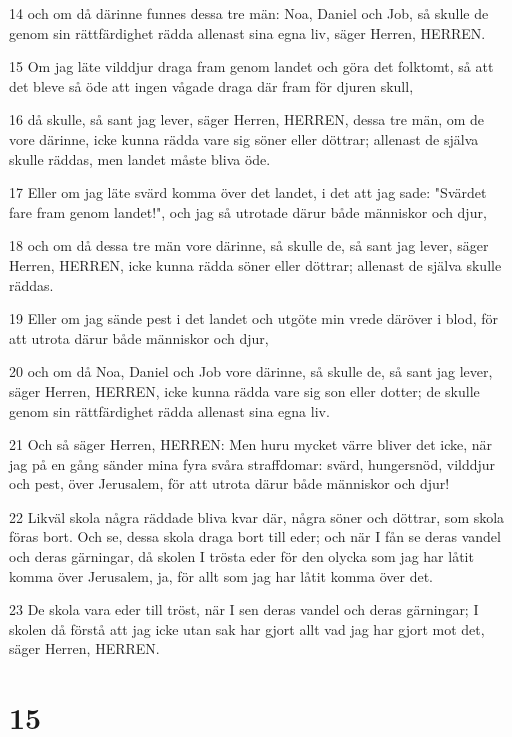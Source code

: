 \par 14 och om då därinne funnes dessa tre män: Noa, Daniel och Job, så skulle de genom sin rättfärdighet rädda allenast sina egna liv, säger Herren, HERREN.
\par 15 Om jag läte vilddjur draga fram genom landet och göra det folktomt, så att det bleve så öde att ingen vågade draga där fram för djuren skull,
\par 16 då skulle, så sant jag lever, säger Herren, HERREN, dessa tre män, om de vore därinne, icke kunna rädda vare sig söner eller döttrar; allenast de själva skulle räddas, men landet måste bliva öde.
\par 17 Eller om jag läte svärd komma över det landet, i det att jag sade: "Svärdet fare fram genom landet!", och jag så utrotade därur både människor och djur,
\par 18 och om då dessa tre män vore därinne, så skulle de, så sant jag lever, säger Herren, HERREN, icke kunna rädda söner eller döttrar; allenast de själva skulle räddas.
\par 19 Eller om jag sände pest i det landet och utgöte min vrede däröver i blod, för att utrota därur både människor och djur,
\par 20 och om då Noa, Daniel och Job vore därinne, så skulle de, så sant jag lever, säger Herren, HERREN, icke kunna rädda vare sig son eller dotter; de skulle genom sin rättfärdighet rädda allenast sina egna liv.
\par 21 Och så säger Herren, HERREN: Men huru mycket värre bliver det icke, när jag på en gång sänder mina fyra svåra straffdomar: svärd, hungersnöd, vilddjur och pest, över Jerusalem, för att utrota därur både människor och djur!
\par 22 Likväl skola några räddade bliva kvar där, några söner och döttrar, som skola föras bort. Och se, dessa skola draga bort till eder; och när I fån se deras vandel och deras gärningar, då skolen I trösta eder för den olycka som jag har låtit komma över Jerusalem, ja, för allt som jag har låtit komma över det.
\par 23 De skola vara eder till tröst, när I sen deras vandel och deras gärningar; I skolen då förstå att jag icke utan sak har gjort allt vad jag har gjort mot det, säger Herren, HERREN.

\chapter{15}

